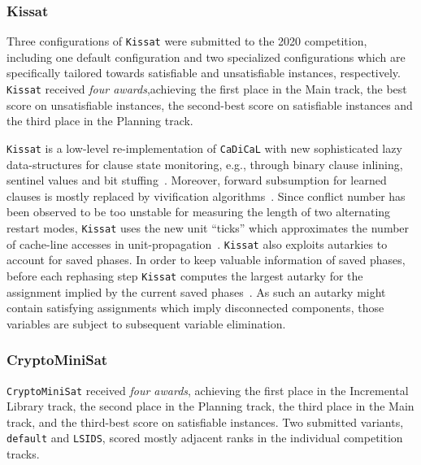 \documentclass{elsarticle}
\newcommand{\solver}[1]{\texttt{#1}}
\begin{document}
\subsubsection{Kissat} 
\label{sec:kissat}

Three configurations of \solver{Kissat} were submitted to the 2020  competition, including one default configuration and two specialized configurations which are specifically tailored towards satisfiable and unsatisfiable instances, respectively. 
\solver{Kissat} received \emph{four awards},achieving the first place in the Main track, 
the best score on unsatisfiable instances, the second-best score on satisfiable instances and the third place in the Planning track. 

\solver{Kissat} is a low-level re-implementation of \solver{CaDiCaL} with new sophisticated lazy data-structures for clause state monitoring, e.g., through binary clause inlining, sentinel values and bit stuffing~\cite{Biere:SC2019,Biere:SC2020}. 
Moreover, forward subsumption for learned clauses is mostly replaced by vivification algorithms~\cite{ChuMinLi:2020:Vivification}. 
Since conflict number has been observed to be too unstable for measuring the length of two alternating restart modes, \solver{Kissat} uses the new unit ``ticks'' which approximates the number of cache-line accesses in unit-propagation~\cite{Biere:SC2020}. 
\solver{Kissat} also exploits autarkies to account for saved phases. 
In order to keep valuable information of saved phases, before each rephasing step \solver{Kissat} computes the largest autarky for the assignment implied by the current saved phases~\cite{Kiesl:2019:Autarkies}. 
As such an autarky might contain satisfying assignments which imply disconnected components, those variables are subject to subsequent variable elimination. 


\subsubsection{CryptoMiniSat}
\label{sec:cryptominisat}

\solver{CryptoMiniSat} received \emph{four awards}, achieving the first place in the Incremental Library track,
the second place in the Planning track, the third place in the Main track, and the third-best score on satisfiable instances. 
Two submitted variants, \solver{default} and \solver{LSIDS}, scored mostly adjacent ranks in the individual competition tracks.
\end{document}
